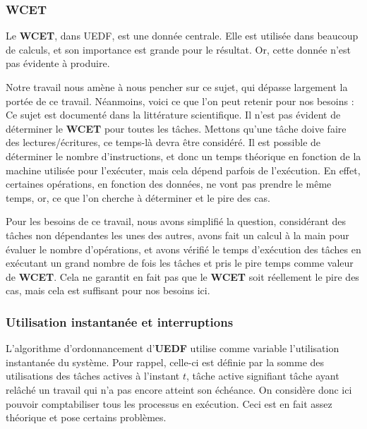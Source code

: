 	
		
	\subsubsection{WCET}
		Le \textbf{WCET}, dans UEDF, est une donnée centrale. Elle est utilisée dans beaucoup de calculs, et 
		son importance est grande pour le résultat. Or, cette donnée n'est pas évidente à produire. \newline
		
		Notre travail nous amène à nous pencher sur ce sujet, qui dépasse largement la portée de ce travail. 
		Néanmoins, voici ce que l'on peut retenir pour nos besoins :\\
		Ce sujet est documenté dans la littérature scientifique. Il n'est pas évident de déterminer le 
		\textbf{WCET} pour toutes les tâches. Mettons qu'une tâche doive faire des lectures/écritures, 
		ce temps-là devra être considéré. Il est possible de déterminer le nombre d'instructions, 
		et donc un temps théorique en fonction de la machine utilisée pour l'exécuter, mais cela dépend 
		parfois de l'exécution. En effet, certaines opérations, en fonction des données, ne vont pas prendre 
		le même temps, or, ce que l'on cherche à déterminer et le pire des cas.\newline
	
		Pour les besoins de ce travail, nous avons simplifié la question, considérant des tâches 
		non dépendantes les unes des autres, avons fait un calcul à la main pour évaluer le 
		nombre d'opérations, et avons vérifié le temps d'exécution des tâches en exécutant un grand nombre 
		de fois les tâches et pris le pire temps comme valeur de \textbf{WCET}. Cela ne garantit en fait 
		pas que le \textbf{WCET} soit réellement le pire des cas, mais cela est suffisant pour nos besoins ici.
	
	\newpage
	\subsubsection{Utilisation instantanée et interruptions}

	L'algorithme d'ordonnancement d'\textbf{UEDF} utilise comme variable l'utilisation instantanée du système. 
	Pour rappel, celle-ci est définie par la somme des utilisations des tâches actives à l'instant $t$, 
	tâche active signifiant tâche ayant relâché un travail qui n'a pas encore atteint son échéance. 
	On considère donc ici pouvoir comptabiliser tous les processus en exécution. Ceci est 
	en fait assez théorique et pose certains problèmes.
	
